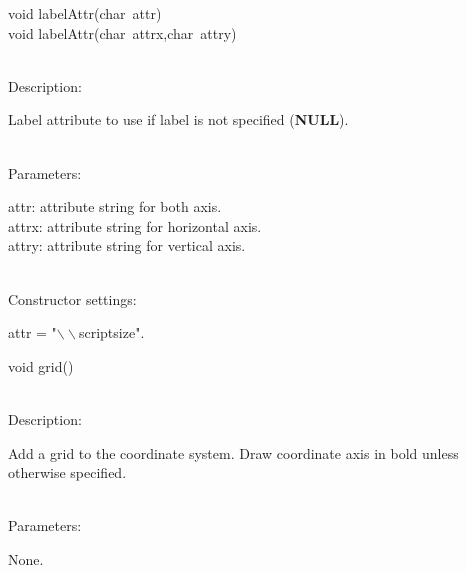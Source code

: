 \documentclass[12pt,a4paper]{article}
\newcommand{\memberitem}[1]{
                              \vspace{-0.5pc}
                              \end{minipage}\\
                              \phantom{M}#1:\\
                              \phantom{MM}
                              \begin{minipage}[t]{12cm}

                           }
\newcommand{\memdsc}{\memberitem{Description}}
\newcommand{\meminp}{\memberitem{Parameters}}
\newcommand{\memdef}{\memberitem{Constructor settings}}
\newenvironment{MemberDescr}
  {
    \begin{minipage}{15cm}
    \bf
  }
  {
    \end{minipage}
  }
\newcommand{\pntr}{\raisebox{-0.25em}{*}\ }
\begin{document}
  \begin{MemberDescr}
    void labelAttr(char\pntr attr)\\
    void labelAttr(char\pntr attrx,char\pntr attry)\\
    \memdsc
      Label attribute to use if label is not specified (\textbf{NULL}).\\
    \meminp
      attr: attribute string for both axis.\\
      attrx: attribute string for horizontal axis.\\
      attry: attribute string for vertical axis.\\
    \memdef
      attr = "$\backslash\backslash$scriptsize".\\
  \end{MemberDescr}

  \begin{MemberDescr}
    void grid()\\
    \memdsc
      Add a grid to the coordinate system. Draw coordinate axis in bold unless
      otherwise specified.\\
    \meminp
      None.\\
  \end{MemberDescr}
\end{document}
